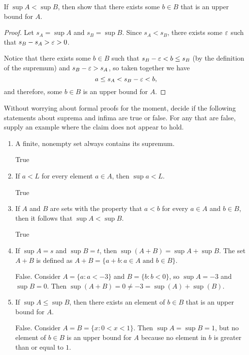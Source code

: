 \begin{problem} \label{prob:sup-upper-bound}
  If $\sup A < \sup B$, then show that there exists some $b \in B$ that is an upper bound for $A$.
\end{problem}

\begin{proof}
  Let $s_A = \sup A$ and $s_B = \sup B$. Since $s_A < s_B$, there exists some
  $\varepsilon$ such that $s_B - s_A > \varepsilon > 0$. 

  Notice that there exists some $b \in B$ such that $s_B - \varepsilon < b \leq s_B$
  (by the definition of the supremum) and $s_B - \varepsilon > s_A$, so taken together
  we have 
  \[
    a \leq s_A < s_B - \varepsilon < b,
  \]
  and therefore, some $b \in B$ is an upper bound for $A$.
\end{proof}

\begin{problem} \label{prob:sup-inf-claims}
  Without worrying about formal proofs for the moment, decide if the following
  statements about suprema and infima are true or false. For any that are false,
  supply an example where the claim does not appear to hold.

  \begin{enumerate}[label=(\alph*)]
    \item A finite, nonempty set always contains its supremum. 

      True

    \item If $a < L$ for every element $a \in A$, then $\sup a < L$.

      True

    \item If $A$ and $B$ are sets with the property that $a < b$ for every $a
      \in A$ and $b \in B$, then it follows that $\sup A < \sup B$.

      True

    \item If $\sup A = s$ and $\sup B = t$, then $\sup (A + B) = \sup A + \sup B$.
      The set $A + B$ is defined as $A + B = \{a + b : a \in A \text{ and } b \in B\}$.

      False. Consider $A = \{ a : a < -3 \}$ and $B = \{ b : b < 0 \}$, so
      $\sup A = -3$ and $\sup B = 0$. Then $\sup(A + B) = 0 \neq -3 = \sup(A) +
      \sup(B)$.

    \item If $\sup A \leq \sup B$, then there exists an element of $b \in B$
      that is an upper bound for $A$. 

      False. Consider $A = B = \{ x : 0 < x < 1 \}$. Then $\sup A = \sup B = 1$,
      but no element of $b \in B$ is an upper bound for $A$ because no element
      in $b$ is greater than or equal to $1$.

  \end{enumerate}

\end{problem}

